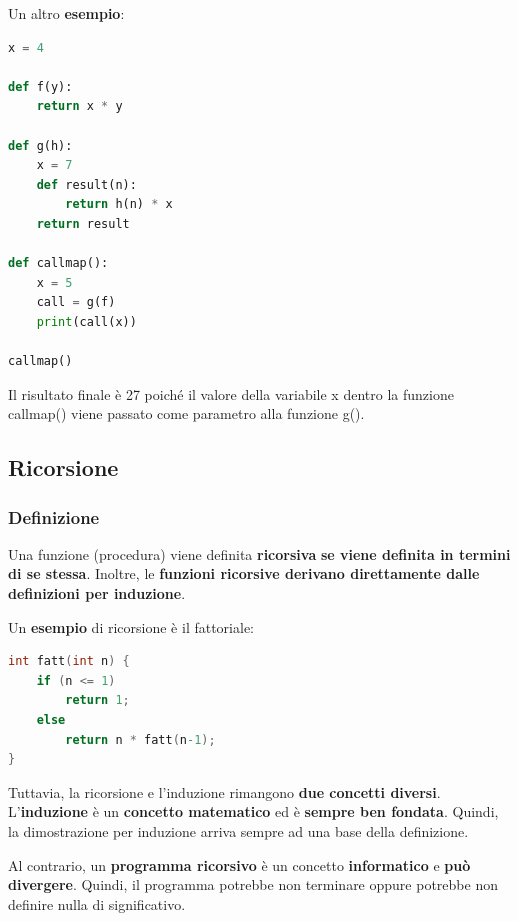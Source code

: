\documentclass[a4paper]{article}
\begin{document}
	\noindent
	Un altro \textcolor{Green4}{\textbf{esempio}}:
	\begin{lstlisting}[language=Python]
x = 4

def f(y):
	return x * y

def g(h):
	x = 7
	def result(n):
		return h(n) * x
	return result

def callmap():
	x = 5
	call = g(f)
	print(call(x))

callmap()\end{lstlisting}
	Il risultato finale è 27 poiché il valore della variabile \textsf{x} dentro la funzione \textsf{callmap()} viene passato come parametro alla funzione \textsf{g()}.\newpage
	
	\subsection{Ricorsione}
	
	\subsubsection{Definizione}
	
	Una funzione (procedura) viene definita \textcolor{Red3}{\textbf{ricorsiva}} \textbf{se viene definita in termini di se stessa}. Inoltre, le \textbf{funzioni ricorsive derivano direttamente dalle definizioni per induzione}.\newline
	
	\noindent
	Un \textcolor{Green4}{\textbf{esempio}} di ricorsione è il fattoriale:
	\begin{lstlisting}[language=C]
int fatt(int n) {
	if (n <= 1)
		return 1;
	else
		return n * fatt(n-1);
}\end{lstlisting}
	Tuttavia, la ricorsione e l'induzione rimangono \textbf{due concetti diversi}. L'\textbf{induzione} è un \textbf{concetto matematico} ed è \textbf{sempre ben fondata}. Quindi, la dimostrazione per induzione arriva sempre ad una base della definizione.
	
	Al contrario, un \textbf{programma ricorsivo} è un concetto \textbf{informatico} e \textbf{può divergere}. Quindi, il programma potrebbe non terminare oppure potrebbe non definire nulla di significativo.\newline
	
\end{document}
